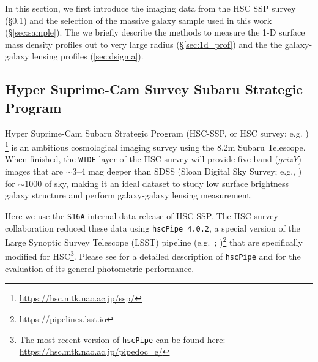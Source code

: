 \documentclass[fleqn,usenatbib,useAMS,english]{mnras}
\begin{document}
     

    In this section, we first introduce the imaging data from the HSC SSP survey
    (\S \ref{sec:hsc}) and the selection of the massive galaxy sample used in this work
    (\S \ref{sec:sample}).
    The we briefly describe the methods to measure the 1-D surface mass density profiles
    out to very large radius (\S \ref{sec:1d_prof}) and the the galaxy-galaxy lensing \dsigma{}
    profiles (\ref{sec:dsigma}).


\subsection{Hyper Suprime-Cam Survey Subaru Strategic Program}
    \label{sec:hsc}

    Hyper Suprime-Cam Subaru Strategic Program (HSC-SSP, or HSC survey; e.g.
    \citealt{HSC-SSP, HSC-DR1, HSC-DR2})
    \footnote{\url{https://hsc.mtk.nao.ac.jp/ssp/}} is an ambitious cosmological imaging survey
    using the 8.2m Subaru Telescope.
    When finished, the \texttt{WIDE} layer of the HSC survey will provide five-band ($grizY$)
    images that are $\sim$3--4 mag deeper than SDSS (Sloan Digital Sky Survey;
    e.g., \citealt{SDSS-DR7, SDSS-DR8, SDSS-DR12}) for $\sim 1000$ \sqdeg{} of sky, making
    it an ideal dataset to study low surface brightness galaxy structure and perform
    galaxy-galaxy lensing measurement.

    Here we use the \texttt{S16A} internal data release of HSC SSP.
    The HSC survey collaboration reduced these data using \texttt{hscPipe 4.0.2}, a special
    version of the Large Synoptic Survey Telescope (LSST) pipeline (e.g.\ \citealt{Juric2015};
    \citealt{Axelrod2010})\footnote{\url{https://pipelines.lsst.io}} that are specifically
    modified for HSC\footnote{The most recent version of \texttt{hscPipe} can be found here:
    \url{https://hsc.mtk.nao.ac.jp/pipedoc_e/}}.
    Please see \citet{HSC-PIPE} for a detailed description of \texttt{hscPipe} and
    \citet{SynPipe} for the evaluation of its general photometric performance.
\end{document}
